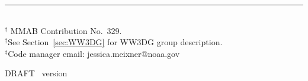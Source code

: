 \vfill

\noindent \rule{140mm}{0.5mm} \\
{\small $^\dag$ MMAB Contribution No.~329. \\
$^\ddag$See Section~\ref{sec:WW3DG} for WW3DG group description.\\
$^\ddag$Code manager email: jessica.meixner@noaa.gov}

\bpage

\pb

         {{\rm DRAFT} \hspace{20.5mm} \ws\ version \WWver}
\pagestyle{myheadings}
\setcounter{page}{1}
\tableofcontents

\pb
\pagestyle{empty}
\bpagea

\pb
\pagestyle{myheadings}



